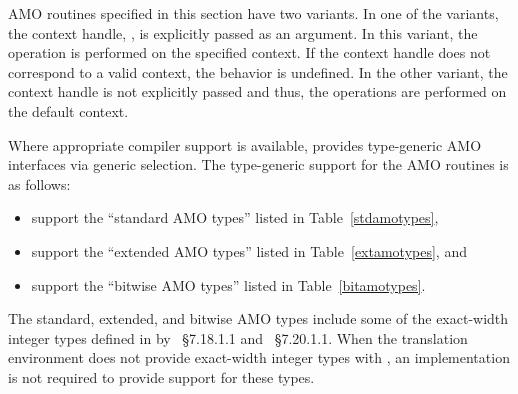 \openshmem \ac{AMO} routines specified in this section have two variants. In
one of the variants, the context handle, , is explicitly passed as
an argument. In this variant, the operation is performed on the specified
context. If the context handle  does not correspond to a valid
context, the behavior is undefined. In the other variant, the context handle
is not explicitly passed and thus, the operations are performed on the
default context.

Where appropriate compiler support is available, \openshmem provides
type-generic \ac{AMO} interfaces via \Cstd[11] generic selection.
The type-generic support for the \ac{AMO} routines is as follows:

\begin{itemize}
\item {}
  support the ``standard \ac{AMO} types'' listed in Table~\ref{stdamotypes},
\item {} support
  the ``extended \ac{AMO} types'' listed in Table~\ref{extamotypes}, and
\item {}
  support the ``bitwise \ac{AMO} types'' listed in Table~\ref{bitamotypes}.
\end{itemize}

The standard, extended, and bitwise \ac{AMO} types include some of the exact-width
integer types defined in  by \Cstd[99]~\S7.18.1.1 and
\Cstd[11]~\S7.20.1.1. When the \Cstd translation environment
does not provide exact-width integer types with , an
\openshmem implementation is not required to provide support for these types.

